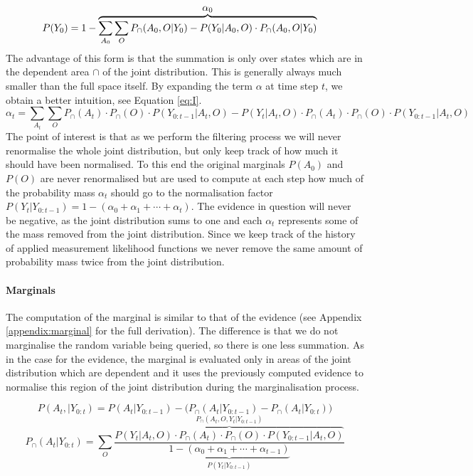 \documentclass[review]{elsarticle}
\numberwithin{equation}{section}
\begin{document}
\begin{align}
  P(Y_0) &= 1 - \overbrace{\sum\limits_{A_0}\sum\limits_{O} P_{\cap}(A_0,O|Y_0) - P(Y_0|A_0,O)\cdot P_{\cap}(A_0,O|Y_0)}^{\mathlarger{\mathlarger{\alpha_0}}}
\end{align}
The advantage of this form is that the summation is only over states which are in the dependent area $\cap$ of the joint 
distribution. This is generally always much smaller than the full space itself. By expanding the term $\alpha$ at time step $t$, 
we obtain a better intuition, see Equation \ref{eq:I}.
\begin{equation}\label{eq:I}
 \alpha_t =  \sum\limits_{A_t}\sum\limits_{O} P_{\cap}(A_t)\cdot P_{\cap}(O) \cdot P(Y_{0:t-1}|A_t,O)  - P(Y_t|A_t,O)\cdot P_{\cap}(A_t)\cdot P_{\cap}(O) \cdot P(Y_{0:t-1}|A_t,O) 
\end{equation}
The point of interest is that as we perform the filtering process we will never renormalise the whole joint distribution, but only keep 
track of how much it should have been normalised. To this end the original marginals $P(A_0)$ and $P(O)$  are never renormalised but are used 
to compute at each step how much of the probability mass $\alpha_t$ should go to the normalisation factor 
$P(Y_t|Y_{0:t-1}) = 1 - (\alpha_{0} + \alpha_{1} + \cdots + \alpha_{t})$. The evidence in question will never be negative, as the 
joint distribution sums to one and each $\alpha_t$ represents some of the mass removed from the joint distribution. Since we 
keep track of the history of applied  measurement likelihood functions we never remove the same amount of probability mass twice
from the joint distribution.


\paragraph{Marginals}

The computation of the marginal is similar to that of the evidence (see Appendix \ref{appendix:marginal} for the full derivation). 
The difference is that we do not marginalise the random variable being queried, so there is one less summation. 
As in the case for the evidence, the marginal is evaluated only in areas of the joint distribution which are dependent 
and it uses the previously computed evidence to normalise this region of the joint distribution during the marginalisation 
process.

\begin{equation}
 P(A_t,|Y_{0:t})  =  P(A_t|Y_{0:t-1}) - \Big(P_{\cap}(A_t|Y_{0:t-1}) -  P_{\cap}(A_t|Y_{0:t})  \Big) \label{eq:marignal_mrf} 
\end{equation}
\begin{equation}\label{eq:marignal_mrf_2}
 P_{\cap}(A_t|Y_{0:t}) = \sum\limits_{O} \frac{\overbrace{P(Y_t|A_t,O) \cdot P_{\cap}(A_t)\cdot P_{\cap}(O) \cdot P(Y_{0:t-1}|A_t,O)}^{P_{\cap}(A_t,O,Y_t|Y_{0:t-1})}}{\underbrace{1  - (\alpha_{0} + \alpha_{1} + \cdots + \alpha_{t-1})}_{P(Y_t|Y_{0:t-1})}}
\end{equation}
\end{document}
